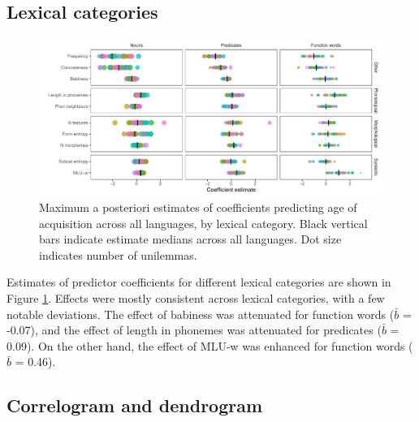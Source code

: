 \documentclass[10pt, letterpaper]{article}
\newenvironment{CodeChunk}{}{}
\begin{document}
\hypertarget{lexical-categories}{%
\subsection{Lexical categories}\label{lexical-categories}}

\begin{CodeChunk}
\begin{figure}[ht]

{\centering \includegraphics[width=500px]{figs/lc_plot-1} 

}

\caption[Maximum a posteriori estimates of coefficients predicting age of acquisition across all languages, by lexical category]{Maximum a posteriori estimates of coefficients predicting age of acquisition across all languages, by lexical category. Black vertical bars indicate estimate medians across all languages. Dot size indicates number of unilemmas.}\label{fig:lc_plot}
\end{figure}
\end{CodeChunk}

Estimates of predictor coefficients for different lexical categories are
shown in Figure \ref{fig:lc_plot}. Effects were mostly consistent across
lexical categories, with a few notable deviations. The effect of
babiness was attenuated for function words (\(\bar{b}\) = -0.07), and
the effect of length in phonemes was attenuated for predicates
(\(\bar{b}\) = 0.09). On the other hand, the effect of MLU-w was
enhanced for function words (\(\bar{b}\) = 0.46).

\hypertarget{correlogram-and-dendrogram}{%
\subsection{Correlogram and
dendrogram}\label{correlogram-and-dendrogram}}
\end{document}
